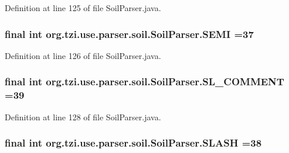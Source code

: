 Definition at line 125 of file Soil\-Parser.\-java.

\hypertarget{classorg_1_1tzi_1_1use_1_1parser_1_1soil_1_1_soil_parser_a25514bc0783e4ff8e4ddea2ffc83901d}{
\subsubsection[{S\-E\-M\-I}]{\setlength{\rightskip}{0pt plus 5cm}final int org.\-tzi.\-use.\-parser.\-soil.\-Soil\-Parser.\-S\-E\-M\-I =37\hspace{0.3cm}{\ttfamily [static]}}}\label{classorg_1_1tzi_1_1use_1_1parser_1_1soil_1_1_soil_parser_a25514bc0783e4ff8e4ddea2ffc83901d}


Definition at line 126 of file Soil\-Parser.\-java.

\hypertarget{classorg_1_1tzi_1_1use_1_1parser_1_1soil_1_1_soil_parser_a28681cac93a48009fbbe4e835cb728e0}{
\subsubsection[{S\-L\-\_\-\-C\-O\-M\-M\-E\-N\-T}]{\setlength{\rightskip}{0pt plus 5cm}final int org.\-tzi.\-use.\-parser.\-soil.\-Soil\-Parser.\-S\-L\-\_\-\-C\-O\-M\-M\-E\-N\-T =39\hspace{0.3cm}{\ttfamily [static]}}}\label{classorg_1_1tzi_1_1use_1_1parser_1_1soil_1_1_soil_parser_a28681cac93a48009fbbe4e835cb728e0}


Definition at line 128 of file Soil\-Parser.\-java.

\hypertarget{classorg_1_1tzi_1_1use_1_1parser_1_1soil_1_1_soil_parser_af17a2636b6554adaa9ad6a479a0355bc}{
\subsubsection[{S\-L\-A\-S\-H}]{\setlength{\rightskip}{0pt plus 5cm}final int org.\-tzi.\-use.\-parser.\-soil.\-Soil\-Parser.\-S\-L\-A\-S\-H =38\hspace{0.3cm}{\ttfamily [static]}}}\label{classorg_1_1tzi_1_1use_1_1parser_1_1soil_1_1_soil_parser_af17a2636b6554adaa9ad6a479a0355bc}


